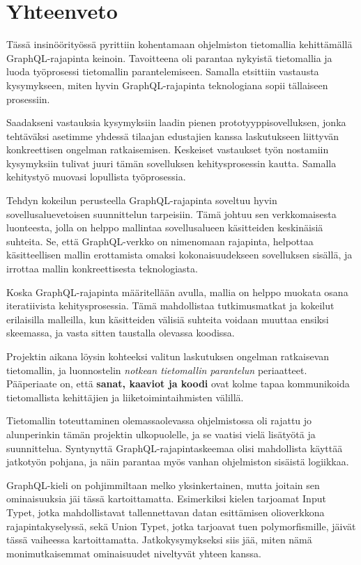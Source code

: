 \hypertarget{yhteenveto}{%
\chapter{Yhteenveto}\label{yhteenveto}}

Tässä insinöörityössä pyrittiin kohentamaan ohjelmiston tietomallia
kehittämällä GraphQL-rajapinta
 keinoin. Tavoitteena
oli parantaa nykyistä tietomallia ja luoda työprosessi tietomallin
parantelemiseen. Samalla etsittiin vastausta kysymykseen, miten hyvin
GraphQL-rajapinta teknologiana sopii tällaiseen prosessiin.

Saadakseni vastauksia kysymyksiin laadin pienen prototyyppisovelluksen,
jonka tehtäväksi asetimme yhdessä tilaajan edustajien kanssa
laskutukseen liittyvän konkreettisen ongelman ratkaisemisen. Keskeiset
vastaukset työn nostamiin kysymyksiin tulivat juuri tämän sovelluksen
kehitysprosessin kautta. Samalla kehitystyö muovasi lopullista
työprosessia.

Tehdyn kokeilun perusteella GraphQL-rajapinta soveltuu hyvin
sovellusaluevetoisen suunnittelun tarpeisiin. Tämä johtuu sen
verkkomaisesta luonteesta, jolla on helppo mallintaa sovellusalueen
käsitteiden keskinäisiä suhteita. Se, että GraphQL-verkko on nimenomaan
rajapinta, helpottaa käsitteellisen mallin erottamista omaksi
kokonaisuudekseen sovelluksen sisällä, ja irrottaa mallin
konkreettisesta teknologiasta.

Koska GraphQL-rajapinta määritellään  avulla,
mallia on helppo muokata osana iteratiivista kehitysprosessia. Tämä
mahdollistaa tutkimusmatkat ja kokeilut erilaisilla malleilla, kun
käsitteiden välisiä suhteita voidaan muuttaa ensiksi skeemassa, ja vasta
sitten taustalla olevassa koodissa.

Projektin aikana löysin kohteeksi valitun laskutuksen ongelman
ratkaisevan tietomallin, ja luonnostelin \emph{notkean tietomallin
parantelun} periaatteet. Pääperiaate on, että \textbf{sanat, kaaviot ja
koodi} ovat kolme tapaa kommunikoida tietomallista kehittäjien ja
liiketoimintaihmisten välillä.

Tietomallin toteuttaminen olemassaolevassa ohjelmistossa oli rajattu jo
alunperinkin tämän projektin ulkopuolelle, ja se vaatisi vielä lisätyötä
ja suunnittelua. Syntynyttä GraphQL-rajapintaskeemaa olisi mahdollista
käyttää jatkotyön pohjana, ja näin parantaa myös vanhan ohjelmiston
sisäistä logiikkaa.

GraphQL-kieli on pohjimmiltaan melko yksinkertainen, mutta joitain sen
ominaisuuksia jäi tässä kartoittamatta. Esimerkiksi kielen tarjoamat
Input Typet, jotka mahdollistavat tallennettavan datan esittämisen
olioverkkona rajapintakyselyssä, sekä Union Typet, jotka tarjoavat tuen
polymorfismille, jäivät tässä vaiheessa kartoittamatta.
Jatkokysymykseksi siis jää, miten nämä monimutkaisemmat ominaisuudet
niveltyvät yhteen 
kanssa.
